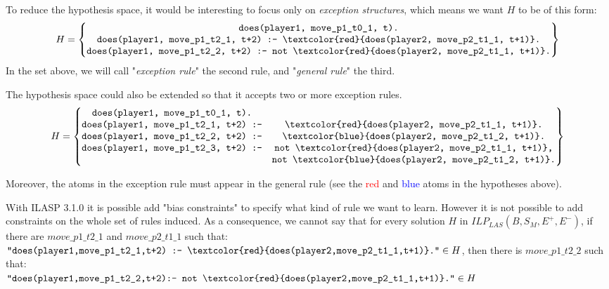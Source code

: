 \documentclass[12pt,twoside]{report}
\begin{document}
To reduce the hypothesis space, it would be interesting to focus only on \textit{exception structures}, which means we want $H$ to be of this form:
\[H=
\begin{Bmatrix}
\texttt{does(player1, move\_p1\_t0\_1, t).}\\
\texttt{does(player1, move\_p1\_t2\_1, t+2) :- \textcolor{red}{does(player2, move\_p2\_t1\_1, t+1)}.}\\
\texttt{does(player1, move\_p1\_t2\_2, t+2) :- not \textcolor{red}{does(player2, move\_p2\_t1\_1, t+1)}.} 
\end{Bmatrix}
\]
In the set above, we will call "\textit{exception rule}" the second rule, and "\textit{general rule}" the third.

\begin{remark}
 The hypothesis space could also be extended so that it accepts two or more  exception rules.
\[H=
\begin{Bmatrix}
\texttt{does(player1, move\_p1\_t0\_1, t).}\\
\texttt{does(player1, move\_p1\_t2\_1, t+2) :-} &\texttt{\textcolor{red}{does(player2, move\_p2\_t1\_1, t+1)}.}\\
\texttt{does(player1, move\_p1\_t2\_2, t+2) :-} &\texttt{\textcolor{blue}{does(player2, move\_p2\_t1\_2, t+1)}.}\\
\texttt{does(player1, move\_p1\_t2\_3, t+2) :-} &\texttt{not \textcolor{red}{does(player2, move\_p2\_t1\_1, t+1)},}\\ &\texttt{not \textcolor{blue}{does(player2, move\_p2\_t1\_2, t+1)}.} 
\end{Bmatrix}
\]
\end{remark}


Moreover, the atoms in the exception rule must appear in the general rule (see the \textcolor{red}{red} and \textcolor{blue}{blue} atoms in the hypotheses above).

\bigskip

With ILASP 3.1.0 it is possible add "bias constraints" to specify what kind of rule we want to learn. However it is not possible to add constraints on the whole set of rules induced. As a consequence, we cannot say that for every solution $H$ in $ILP_{LAS}(B,S_M,E^+,E^-)$, 
if there are $move\_p1\_t2\_1$ and $move\_p2\_t1\_1$ such that:
\\ $\texttt{"does(player1,move\_p1\_t2\_1,t+2) :- \textcolor{red}{does(player2,move\_p2\_t1\_1,t+1)}."}\in H$, 
then there is $move\_p1\_t2\_2$ such that:\\
$\texttt{"does(player1,move\_p1\_t2\_2,t+2):- not \textcolor{red}{does(player2,move\_p2\_t1\_1,t+1)}."}\in H$
\end{document}

